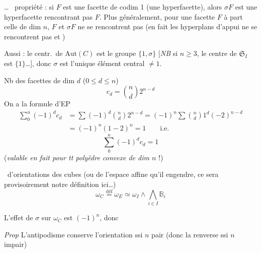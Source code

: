 \documentclass[11pt,a4paper]{article}
\begin{document}
\ldots\ \struck{\ill{}} propriété : si $F$ est une facette de codim 1
(une hyperfacette), alors $\sigma F$ est une hyperfacette
 rencontrant pas $F$. Plus généralement, pour une facette $F$
 \add{\ill{}} à part celle de dim $n$, $F$ et $\sigma
F$ ne se rencontrent pas (en fait les hyperplans d'appui ne se rencontrent
pas et  \ill{})

\marginal{$/\!/$\,)}
Aussi : le centr.\ de $\mathrm{Aut}(C)$ est le groupe $\lbrace 1, \sigma
\rbrace$ [\emph{NB} si $n \geqslant 3$, le centre de $\mathfrak{S}_I$ est
$\lbrace 1 \rbrace$\ldots], donc $\sigma$ est l'unique élément central $\neq
1$.

\marginal{\ill{}}
Nb des facettes de dim $d$ ($0 \leqslant d \leqslant n$)
\[
  c_d = \binom{n}{d} 2^{n-d}
\]
On a la formule d'EP
\begin{align*}
  \sum_0^n (-1)^d c_d &= \sum (-1)^d \binom{n}{d} 2^{n-d} = (-1)^n \sum
  \binom{n}{d} 1^d (-2)^{n-d} \\
  &= (-1)^n (1-2)^n = 1 \qquad \text{i.e.}
\end{align*}
\[
  \boxed{\ \sum_0^n (-1)^d c_d = 1\ }
\]
(\emph{valable en fait pour tt polyèdre convexe de dim $n$} !)

\ d'orientations des cubes (ou de l'espace affine qu'il
engendre, ce sera provisoirement notre définition ici\ldots)
\[
  \omega_C \overset{\text{déf}}{=} \omega_E \simeq \omega_I \wedge
  \bigwedge_{i \in I} \mathbb{B}_i
\]

L'effet de $\sigma$ sur $\omega_C$ est $(-1)^n$, donc

\emph{Prop} L'antipodisme conserve l'orientation ssi $n$ pair (donc la
renverse ssi $n$ impair)
\end{document}
